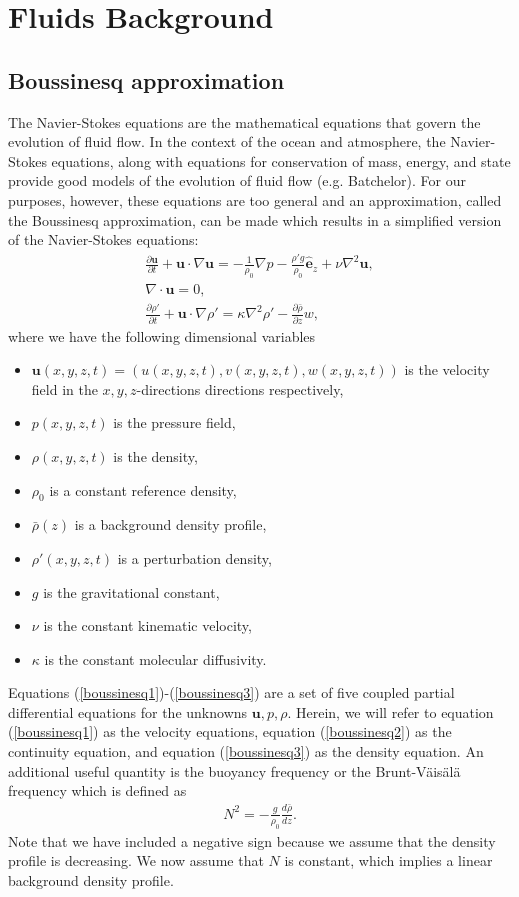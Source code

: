 \chapter{Fluids Background}
\section{Boussinesq approximation}

The Navier-Stokes equations are the mathematical equations that govern the evolution of fluid flow. In the context of the ocean and atmosphere, the Navier-Stokes equations, along with equations for conservation of mass, energy, and state provide good models of the evolution of fluid flow (e.g. Batchelor\cite{batchelor}). For our purposes, however, these equations are too general and an approximation, called the Boussinesq approximation, can be made which results in a simplified version of the Navier-Stokes equations:  
\begin{align} 
\frac{\partial \bm{u}}{\partial t} + \bm{u}\cdot \nabla \bm{u} = -\frac{1}{\rho_{0}}\nabla p - \frac{\rho' g}{\rho_{0}}\hat{\bm{e}}_{z} + \nu \nabla^{2}\bm{u} \label{boussinesq1},\\
\nabla \cdot \bm{u} =0 \label{boussinesq2},\\
\frac{\partial \rho'}{\partial t} + \bm{u}\cdot \nabla \rho' = \kappa \nabla^{2}\rho' - \frac{\partial \bar{\rho}}{\partial z} w,\label{boussinesq3}
\end{align}
where we have the following dimensional variables
\begin{itemize}
\item $\textbf{u}(x,y,z,t)=(u(x,y,z,t),v(x,y,z,t),w(x,y,z,t))$ is the velocity field in the $x,y,z$-directions directions respectively,
\item $p(x,y,z,t)$ is the pressure field,
\item $\rho(x,y,z,t)$ is the density,
\item $\rho_{0}$ is a constant reference density,
\item $\bar{\rho}(z)$ is a background density profile,
\item $\rho'(x,y,z,t)$ is a perturbation density,
\item $g$ is the gravitational constant,
\item $\nu$ is the constant kinematic velocity,
\item $\kappa$ is the constant molecular diffusivity.
\end{itemize}
Equations (\ref{boussinesq1})-(\ref{boussinesq3}) are a set of five coupled partial differential equations for the unknowns $\textbf{u},p,\rho$. Herein, we will refer to equation (\ref{boussinesq1}) as the velocity equations, equation (\ref{boussinesq2}) as the continuity equation, and equation (\ref{boussinesq3}) as the density equation. An additional useful quantity is the buoyancy frequency or the Brunt-V\"ais\"al\"a frequency which is defined as
\begin{align}
N^{2} = -\frac{g}{\rho_{0}}\frac{d\bar{\rho}}{dz}.
\end{align}
Note that we have included a negative sign because we assume that the density profile is decreasing. We now assume that $N$ is constant, which implies a linear background density profile.

